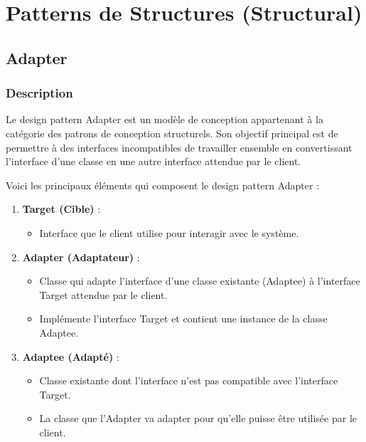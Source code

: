 \section{Patterns de Structures (Structural)}

\subsection{Adapter}


\subsubsection{Description}

Le design pattern Adapter est un modèle de conception appartenant à la catégorie des patrons de conception structurels. Son objectif principal est de permettre à des interfaces incompatibles de travailler ensemble en convertissant l'interface d'une classe en une autre interface attendue par le client.

Voici les principaux éléments qui composent le design pattern Adapter :

\begin{enumerate}[leftmargin=*,labelsep=3mm]
    \item \textbf{Target (Cible)} :
    \begin{itemize}
        \item Interface que le client utilise pour interagir avec le système.
    \end{itemize}
    
    \item \textbf{Adapter (Adaptateur)} :
    \begin{itemize}
        \item Classe qui adapte l'interface d'une classe existante (Adaptee) à l'interface Target attendue par le client.
        \item Implémente l'interface Target et contient une instance de la classe Adaptee.
    \end{itemize}
    
    \item \textbf{Adaptee (Adapté)} :
    \begin{itemize}
        \item Classe existante dont l'interface n'est pas compatible avec l'interface Target.
        \item La classe que l'Adapter va adapter pour qu'elle puisse être utilisée par le client.
    \end{itemize}
\end{enumerate}

